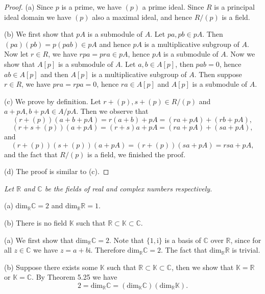 \begin{proof}
(a) Since $p$ is a prime, we have $(p)$ a prime ideal. Since $R$ is a principal ideal domain we have $(p)$ also a maximal ideal, and hence $R/(p)$ is a field.\par
(b) We first show that $pA$ is a submodule of $A$. Let $pa,pb\in pA$. Then $(pa)(pb)=p(pab)\in pA$ and hence $pA$ is a multiplicative subgroup of $A$. Now let $r\in R$, we have $rpa=pra\in pA$, hence $pA$ is a submodule of $A$. Now we show that $A[p]$ is a submodule of $A$. Let $a,b\in A[p]$, then $pab=0$, hence $ab\in A[p]$ and then $A[p]$ is a multiplicative subgroup of $A$. Then suppose $r\in R$, we have $pra=rpa=0$, hence $ra\in A[p]$ and $A[p]$ is a submodule of $A$.\par
(c) We prove by definition. Let $r+(p),s+(p)\in R/(p)$ and $a+pA,b+pA\in A/pA$. Then we observe that 
$$
\left( r+\left( p \right) \right) \left( a+b+pA \right) =r\left( a+b \right) +pA=\left( ra+pA \right) +\left( rb+pA \right) ,
$$
$$
\left( r+s+\left( p \right) \right) \left( a+pA \right) =\left( r+s \right) a+pA=\left( ra+pA \right) +\left( sa+pA \right) ,
$$
and 
$$
\left( r+\left( p \right) \right) \left( s+\left( p \right) \right) \left( a+pA \right) =\left( r+\left( p \right) \right) \left( sa+pA \right) =rsa+pA,
$$
and the fact that $R/(p)$ is a field, we finished the proof.\par
(d) The proof is similar to (c).
\end{proof}
\begin{problem}\em
Let $\mathbb{R}$ and $\mathbb{C}$ be the fields of real and complex numbers respectively.\par
(a) $\mathrm{dim}_\mathbb{R}\mathbb{C}=2$ and $\mathrm{dim}_\mathbb{R}\mathbb{R}=1$.\par
(b) There is no field $\mathbb{K}$ such that $\mathbb{R}\subset\mathbb{K}\subset\mathbb{C}$.
\end{problem}
(a) We first show that $\mathrm{dim}_\mathbb{R}\mathbb{C}=2$. Note that $\{1,\mathrm{i}\}$ is a basis of $\mathbb{C}$ over $\mathbb{R}$, since for all $z\in\mathbb{C}$ we have $z=a+b\mathrm{i}$. Therefore $\mathrm{dim}_\mathbb{R}\mathbb{C}=2$. The fact that $\mathrm{dim}_\mathbb{R}\mathbb{R}$ is trivial.\par
(b) Suppose there exists some $\mathbb{K}$ such that $\mathbb{R}\subset\mathbb{K}\subset\mathbb{C}$, then we show that $\mathbb{K}=\mathbb{R}$ or $\mathbb{K}=\mathbb{C}$. By Theorem 5.25 we have 
$$
2=\mathrm{dim}_{\mathbb{R}}\mathbb{C} =\left( \mathrm{dim}_{\mathbb{K}}\mathbb{C} \right) \left( \mathrm{dim}_{\mathbb{R}}\mathbb{K} \right) .
$$
